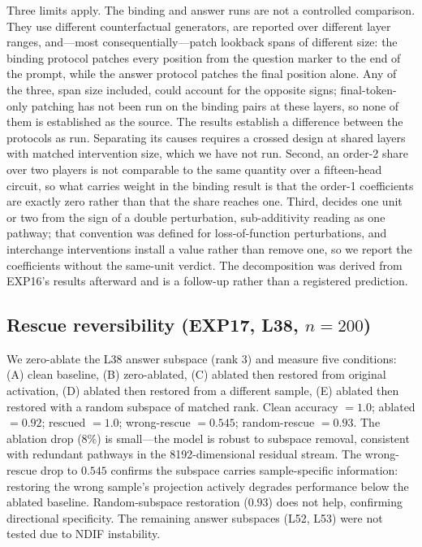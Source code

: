 \documentclass{article}
\begin{document}
Three limits apply. The binding and answer runs are not a controlled comparison. They use
different counterfactual generators, are reported over different layer ranges, and---most
consequentially---patch lookback spans of different size: the binding protocol patches every
position from the question marker to the end of the prompt, while the answer protocol patches
the final position alone. Any of the three, span size included, could
account for the opposite signs; final-token-only patching has not been run on the binding pairs
at these layers, so none of them is established as the source. The results establish a
difference between the protocols as run. Separating its causes requires a crossed design at
shared layers with matched intervention size, which we have not run. Second, an order-2 share over two players is
not comparable to the same quantity over a fifteen-head circuit, so what carries weight in the
binding result is that the order-1 coefficients are exactly zero rather than that the share
reaches one. Third, \citet{benzer1955}
decides one unit or two from the sign of a double perturbation, sub-additivity reading as one
pathway; that convention was defined for loss-of-function perturbations, and interchange
interventions install a value rather than remove one, so we report the coefficients without
the same-unit verdict. The decomposition was derived from EXP16's results afterward and is a
follow-up rather than a registered prediction.

\subsection{Rescue reversibility (EXP17, L38, $n = 200$)}

We zero-ablate the L38 answer subspace (rank 3) and measure five conditions: (A) clean baseline, (B) zero-ablated, (C) ablated then restored from original activation, (D) ablated then restored from a different sample, (E) ablated then restored with a random subspace of matched rank. Clean accuracy $= 1.0$; ablated $= 0.92$; rescued $= 1.0$; wrong-rescue $= 0.545$; random-rescue $= 0.93$. The ablation drop (8\%) is small---the model is robust to subspace removal, consistent with redundant pathways in the 8192-dimensional residual stream. The wrong-rescue drop to $0.545$ confirms the subspace carries sample-specific information: restoring the wrong sample's projection actively degrades performance below the ablated baseline. Random-subspace restoration ($0.93$) does not help, confirming directional specificity. The remaining answer subspaces (L52, L53) were not tested due to NDIF instability.
\end{document}
